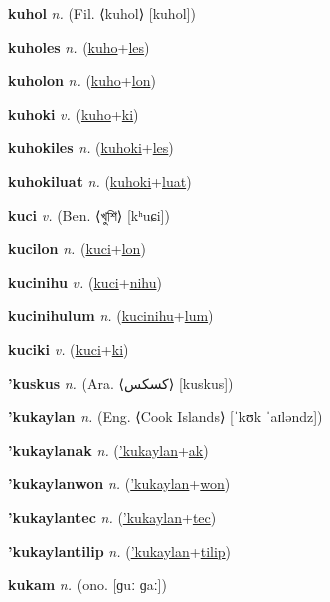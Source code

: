 \textbf{\hypertarget{kuhol}{kuhol}} \textit{n.} (Fil. ⟨kuhol⟩ [kuhol])


\textbf{\hypertarget{kuholes}{kuholes}} \textit{n.} (\hyperlink{kuho}{kuho}+\allowbreak \hyperlink{les}{les})


\textbf{\hypertarget{kuholon}{kuholon}} \textit{n.} (\hyperlink{kuho}{kuho}+\allowbreak \hyperlink{lon}{lon})


\textbf{\hypertarget{kuhoki}{kuhoki}} \textit{v.} (\hyperlink{kuho}{kuho}+\allowbreak \hyperlink{ki}{ki})


\textbf{\hypertarget{kuhokiles}{kuhokiles}} \textit{n.} (\hyperlink{kuhoki}{kuhoki}+\allowbreak \hyperlink{les}{les})


\textbf{\hypertarget{kuhokiluat}{kuhokiluat}} \textit{n.} (\hyperlink{kuhoki}{kuhoki}+\allowbreak \hyperlink{luat}{luat})


\textbf{\hypertarget{kuci}{kuci}} \textit{v.} (Ben. ⟨{\bengali{}খুশি}⟩ [kʰuɕi])


\textbf{\hypertarget{kucilon}{kucilon}} \textit{n.} (\hyperlink{kuci}{kuci}+\allowbreak \hyperlink{lon}{lon})


\textbf{\hypertarget{kucinihu}{kucinihu}} \textit{v.} (\hyperlink{kuci}{kuci}+\allowbreak \hyperlink{nihu}{nihu})


\textbf{\hypertarget{kucinihulum}{kucinihulum}} \textit{n.} (\hyperlink{kucinihu}{kucinihu}+\allowbreak \hyperlink{lum}{lum})


\textbf{\hypertarget{kuciki}{kuciki}} \textit{v.} (\hyperlink{kuci}{kuci}+\allowbreak \hyperlink{ki}{ki})


\textbf{\hypertarget{'kuskus}{'kuskus}} \textit{n.} (Ara. ⟨{\arabics{}كسكس}⟩ [kuskus])


\textbf{\hypertarget{'kukaylan}{'kukaylan}} \textit{n.} (Eng. ⟨Cook Islands⟩ [ˈkʊk ˈaɪləndz])


\textbf{\hypertarget{'kukaylanak}{'kukaylanak}} \textit{n.} (\hyperlink{'kukaylan}{'kukaylan}+\allowbreak \hyperlink{ak}{ak})


\textbf{\hypertarget{'kukaylanwon}{'kukaylanwon}} \textit{n.} (\hyperlink{'kukaylan}{'kukaylan}+\allowbreak \hyperlink{won}{won})


\textbf{\hypertarget{'kukaylantec}{'kukaylantec}} \textit{n.} (\hyperlink{'kukaylan}{'kukaylan}+\allowbreak \hyperlink{tec}{tec})


\textbf{\hypertarget{'kukaylantilip}{'kukaylantilip}} \textit{n.} (\hyperlink{'kukaylan}{'kukaylan}+\allowbreak \hyperlink{tilip}{tilip})


\textbf{\hypertarget{kukam}{kukam}} \textit{n.} (ono. [ɡuː ɡaː])


